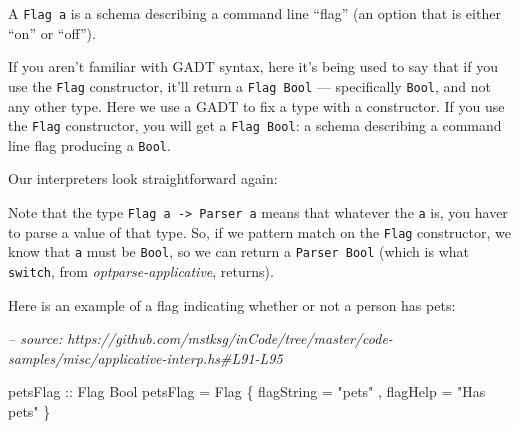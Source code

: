 \documentclass[]{article}
\newenvironment{Shaded}{}{}
\newcommand{\CommentTok}[1]{\textcolor[rgb]{0.38,0.63,0.69}{\textit{#1}}}
\newcommand{\DataTypeTok}[1]{\textcolor[rgb]{0.56,0.13,0.00}{#1}}
\newcommand{\NormalTok}[1]{#1}
\newcommand{\OperatorTok}[1]{\textcolor[rgb]{0.40,0.40,0.40}{#1}}
\newcommand{\OtherTok}[1]{\textcolor[rgb]{0.00,0.44,0.13}{#1}}
\newcommand{\StringTok}[1]{\textcolor[rgb]{0.25,0.44,0.63}{#1}}
\begin{document}
A \texttt{Flag\ a} is a schema describing a command line ``flag'' (an option
that is either ``on'' or ``off'').

If you aren't familiar with GADT syntax, here it's being used to say that if you
use the \texttt{Flag} constructor, it'll return a \texttt{Flag\ Bool} ---
specifically \texttt{Bool}, and not any other type. Here we use a GADT to fix a
type with a constructor. If you use the \texttt{Flag} constructor, you will get
a \texttt{Flag\ Bool}: a schema describing a command line flag producing a
\texttt{Bool}.

Our interpreters look straightforward again:

\begin{Shaded}
\end{Shaded}

Note that the type \texttt{Flag\ a\ -\textgreater{}\ Parser\ a} means that
whatever the \texttt{a} is, you haver to parse a value of that type. So, if we
pattern match on the \texttt{Flag} constructor, we know that \texttt{a} must be
\texttt{Bool}, so we can return a \texttt{Parser\ Bool} (which is what
\texttt{switch}, from \emph{optparse-applicative}, returns).

Here is an example of a flag indicating whether or not a person has pets:

\begin{Shaded}
\begin{Highlighting}[]
\CommentTok{-- source: https://github.com/mstksg/inCode/tree/master/code-samples/misc/applicative-interp.hs#L91-L95}

\OtherTok{petsFlag ::} \DataTypeTok{Flag} \DataTypeTok{Bool}
\NormalTok{petsFlag }\OtherTok{=} \DataTypeTok{Flag}
\NormalTok{    \{ flagString }\OtherTok{=} \StringTok{"pets"}
\NormalTok{    , flagHelp   }\OtherTok{=} \StringTok{"Has pets"}
\NormalTok{    \}}
\end{Highlighting}
\end{Shaded}
\end{document}
